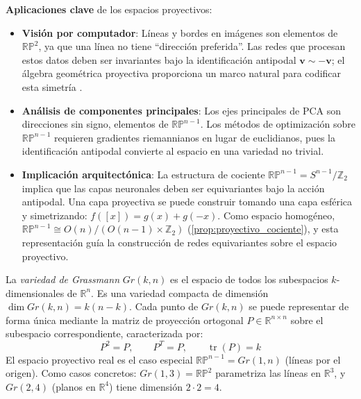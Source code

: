 \textbf{Aplicaciones clave} de los espacios proyectivos:
\begin{itemize}
    \item \textbf{Visión por computador}: Líneas y bordes en imágenes son elementos de $\mathbb{RP}^2$, ya que una línea no tiene ``dirección preferida''. Las redes que procesan estos datos deben ser invariantes bajo la identificación antipodal $\mathbf{v} \sim -\mathbf{v}$; el álgebra geométrica proyectiva proporciona un marco natural para codificar esta simetría \citep{dehaan2024euclideanprojectiveconformalchoosing}.

    \item \textbf{Análisis de componentes principales}: Los ejes principales de \gls{PCA} son direcciones sin signo, elementos de $\mathbb{RP}^{n-1}$. Los métodos de optimización sobre $\mathbb{RP}^{n-1}$ requieren gradientes riemannianos en lugar de euclidianos, pues la identificación antipodal convierte al espacio en una variedad no trivial.

    \item \textbf{Implicación arquitectónica}: La estructura de cociente $\mathbb{RP}^{n-1} = S^{n-1}/\mathbb{Z}_2$ implica que las capas neuronales deben ser equivariantes bajo la acción antipodal. Una capa proyectiva se puede construir tomando una capa esférica y simetrizando: $f([x]) = g(x) + g(-x)$. Como espacio homogéneo, $\mathbb{RP}^{n-1} \cong O(n)/(O(n-1) \times \mathbb{Z}_2)$ (\autoref{prop:proyectivo_cociente}), y esta representación guía la construcción de redes equivariantes sobre el espacio proyectivo.
\end{itemize}

\begin{definition}\label{def:variedad_grassmann}
La \textit{variedad de Grassmann} $Gr(k,n)$ es el espacio de todos los subespacios $k$-dimensionales de $\mathbb{R}^n$. Es una variedad compacta de dimensión $\dim Gr(k,n) = k(n-k)$. Cada punto de $Gr(k,n)$ se puede representar de forma única mediante la matriz de proyección ortogonal $P \in \mathbb{R}^{n \times n}$ sobre el subespacio correspondiente, caracterizada por:
\[
P^2 = P, \qquad P^T = P, \qquad \operatorname{tr}(P) = k
\]
El espacio proyectivo real es el caso especial $\mathbb{RP}^{n-1} = Gr(1,n)$ (líneas por el origen). Como casos concretos: $Gr(1,3) = \mathbb{RP}^2$ parametriza las líneas en $\mathbb{R}^3$, y $Gr(2,4)$ (planos en $\mathbb{R}^4$) tiene dimensión $2 \cdot 2 = 4$.
\end{definition}


